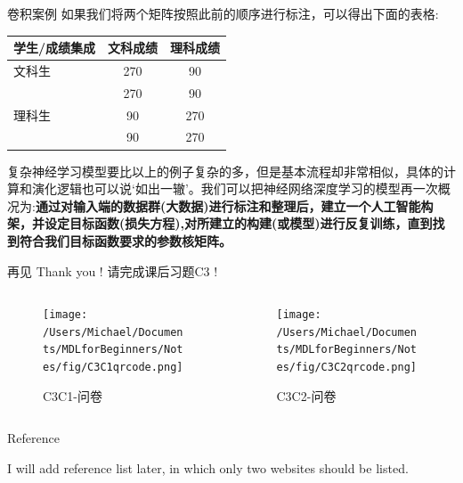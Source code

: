 \documentclass[handout]{beamer}
\begin{document}
\begin{frame}{卷积案例}
如果我们将两个矩阵按照此前的顺序进行标注，可以得出下面的表格:
\begin{table}[H]
\renewcommand{\arraystretch}{1.2}
	\centering
	\begin{tabular}{|l|cc|}
	\hline 
		学生/成绩集成 & 文科成绩 & 理科成绩 \\
		\hline 
		文科生& 270 & 90 \\
		& 270 & 90 \\
		\hline 
		理科生& 90 & 270 \\
		& 90 & 270 \\
		\hline 
	\end{tabular}
\end{table}
{\footnotesize
复杂神经学习模型要比以上的例子复杂的多，但是基本流程却非常相似，具体的计算和演化逻辑也可以说`如出一辙'。我们可以把神经网络深度学习的模型再一次概况为:\textbf{通过对输入端的数据群(大数据)进行标注和整理后，建立一个人工智能构架，并设定目标函数(损失方程),对所建立的构建(或模型)进行反复训练，直到找到符合我们目标函数要求的参数核矩阵。}
}
\end{frame}


\begin{frame}{再见}
	Thank you !  请完成课后习题C3 !
\begin{columns}
	\begin{column}{0.4\textwidth}
			\begin{figure}[H]
				\centering
			\texttt{[image: /Users/Michael/Documents/MDLforBeginners/Notes/fig/C3C1qrcode.png]}
			\caption{C3C1-问卷}
			\end{figure}
	\end{column}
	\begin{column}{0.4\textwidth}
		\begin{figure}[H]
	\texttt{[image: /Users/Michael/Documents/MDLforBeginners/Notes/fig/C3C2qrcode.png]}
	\caption{C3C2-问卷}
\end{figure}	
	\end{column}
\end{columns}
\end{frame}



\begin{frame}[allowframebreaks]{Reference}
  
  
  I will add reference list later, in which only two websites should be listed. 
\end{frame}
\end{document}
